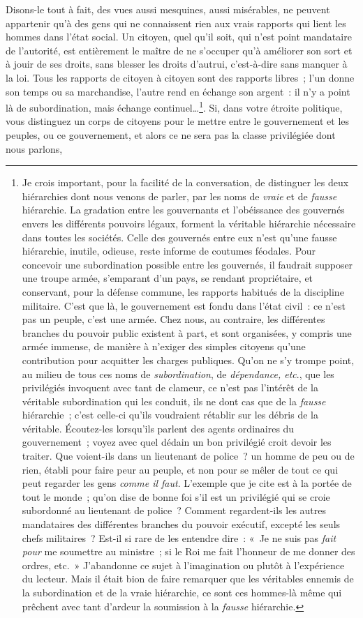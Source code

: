 \documentclass[french,twoside]{book} %
\begin{document}
Disons-le tout à fait, des vues aussi mesquines, aussi misérables, ne peuvent appartenir qu’à des gens qui ne connaissent rien aux vrais rapports qui lient les hommes dans l’état social. Un citoyen, quel qu’il soit, qui n’est point mandataire de l’autorité, est entièrement le maître de ne s’occuper qu’à améliorer son sort et à jouir de ses droits, sans blesser les droits d’autrui, c’est-à-dire sans manquer à la loi. Tous les rapports de citoyen à citoyen sont des rapports libres ; l’un donne son temps ou sa marchandise, l’autre rend en échange son argent : il n’y a point là de subordination, mais échange continuel…\footnote{Je crois important, pour la facilité de la conversation, de distinguer les deux hiérarchies dont nous venons de parler, par les noms de {\itshape vraie} et de {\itshape fausse} hiérarchie. La gradation entre les gouvernants et l’obéissance des gouvernés envers les différents pouvoirs légaux, forment la véritable hiérarchie nécessaire dans toutes les sociétés. Celle des gouvernés entre eux n’est qu’une fausse hiérarchie, inutile, odieuse, reste informe de coutumes féodales. Pour concevoir une subordination possible entre les gouvernés, il faudrait supposer une troupe armée, s’emparant d’un pays, se rendant propriétaire, et conservant, pour la défense commune, les rapports habitués de la discipline militaire. C’est que là, le gouvernement est fondu dans l’état civil : ce n’est pas un peuple, c’est une armée. Chez nous, au contraire, les différentes branches du pouvoir public existent à part, et sont organisées, y compris une armée immense, de manière à n’exiger des simples citoyens qu’une contribution pour acquitter les charges publiques. Qu’on ne s’y trompe point, au milieu de tous ces noms de {\itshape subordination}, de {\itshape dépendance, etc}., que les privilégiés invoquent avec tant de clameur, ce n’est pas l’intérêt de la véritable subordination qui les conduit, ils ne dont cas que de la {\itshape fausse} hiérarchie ; c’est celle-ci qu’ils voudraient rétablir sur les débris de la véritable. Écoutez-les lorsqu’ils parlent des agents ordinaires du gouvernement ; voyez avec quel dédain un bon privilégié croit devoir les traiter. Que voient-ils dans un lieutenant de police ? un homme de peu ou de rien, établi pour faire peur au peuple, et non pour se mêler de tout ce qui peut regarder les gens {\itshape comme il faut}. L’exemple que je cite est à la portée de tout le monde ; qu’on dise de bonne foi s’il est un privilégié qui se croie subordonné au lieutenant de police ? Comment regardent-ils les autres mandataires des différentes branches du pouvoir exécutif, excepté les seuls chefs militaires ? Est-il si rare de les entendre dire : « Je ne suis pas {\itshape fait pour} me soumettre au ministre ; si le Roi me fait l’honneur de me donner des ordres, etc. » J’abandonne ce sujet à l’imagination ou plutôt à l’expérience du lecteur. Mais il était bion de faire remarquer que les véritables ennemis de la subordination et de la vraie hiérarchie, ce sont ces hommes-là même qui prêchent avec tant d’ardeur la soumission à la {\itshape fausse} hiérarchie.}. Si, dans votre étroite politique, vous distinguez un corps de citoyens pour le mettre entre le gouvernement et les peuples, ou ce gouvernement, et alors ce ne sera pas la classe privilégiée dont nous parlons, 
\end{document}
